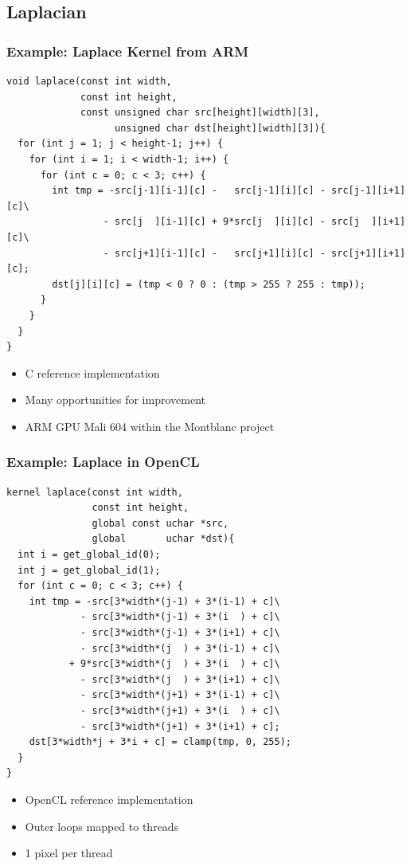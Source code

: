 \documentclass{beamer}
\begin{document}
\subsection{Laplacian}

\begin{frame}[fragile]
  \frametitle{Example: Laplace Kernel from ARM}
\lstset{style=BC}
\begin{lstlisting}
void laplace(const int width,
             const int height,
             const unsigned char src[height][width][3],
                   unsigned char dst[height][width][3]){
  for (int j = 1; j < height-1; j++) {
    for (int i = 1; i < width-1; i++) {
      for (int c = 0; c < 3; c++) {
        int tmp = -src[j-1][i-1][c] -   src[j-1][i][c] - src[j-1][i+1][c]\
                 - src[j  ][i-1][c] + 9*src[j  ][i][c] - src[j  ][i+1][c]\
                 - src[j+1][i-1][c] -   src[j+1][i][c] - src[j+1][i+1][c];
        dst[j][i][c] = (tmp < 0 ? 0 : (tmp > 255 ? 255 : tmp));
      }
    }
  }
}
\end{lstlisting}
\begin{itemize}
\item C reference implementation
\item Many opportunities for improvement
\item ARM GPU Mali 604 within the Montblanc project
\end{itemize}
\end{frame}


\begin{frame}[fragile]
  \frametitle{Example: Laplace in OpenCL}
\lstset{style=BC}
\begin{lstlisting}
kernel laplace(const int width,
               const int height,
               global const uchar *src,
               global       uchar *dst){
  int i = get_global_id(0);
  int j = get_global_id(1);
  for (int c = 0; c < 3; c++) {
    int tmp = -src[3*width*(j-1) + 3*(i-1) + c]\
             - src[3*width*(j-1) + 3*(i  ) + c]\
             - src[3*width*(j-1) + 3*(i+1) + c]\
             - src[3*width*(j  ) + 3*(i-1) + c]\
           + 9*src[3*width*(j  ) + 3*(i  ) + c]\
             - src[3*width*(j  ) + 3*(i+1) + c]\
             - src[3*width*(j+1) + 3*(i-1) + c]\
             - src[3*width*(j+1) + 3*(i  ) + c]\
             - src[3*width*(j+1) + 3*(i+1) + c];
    dst[3*width*j + 3*i + c] = clamp(tmp, 0, 255);
  }
}
\end{lstlisting}
\begin{itemize}
\item OpenCL reference implementation
\item Outer loops mapped to threads
\item 1 pixel per thread
\end{itemize}
\end{frame}
\end{document}
